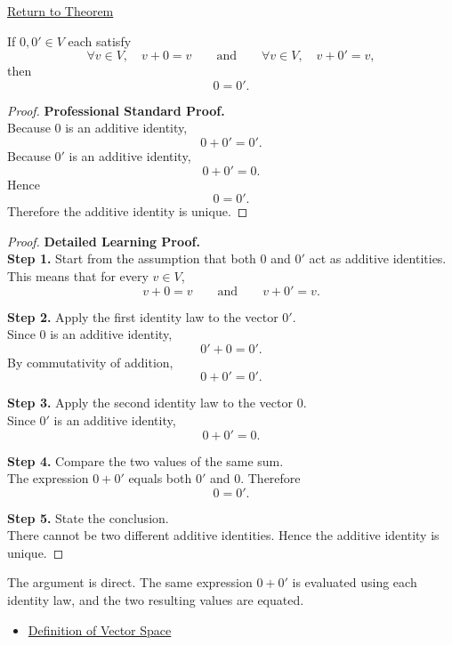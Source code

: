 
\newpage
{}
\label{prf:unique-additive-identity}

\begin{remark*}[Return]
\hyperref[thm:unique-additive-identity]{Return to Theorem}
\end{remark*}

\begin{theorem*}
If $0,0' \in V$ each satisfy
\[
\forall v \in V,\quad v+0=v
\qquad\text{and}\qquad
\forall v \in V,\quad v+0'=v,
\]
then
\[
0=0'.
\]
\end{theorem*}

\begin{proof}
\textbf{Professional Standard Proof.}~\\
Because $0$ is an additive identity,
\[
0+0'=0'.
\]
Because $0'$ is an additive identity,
\[
0+0'=0.
\]
Hence
\[
0=0'.
\]
Therefore the additive identity is unique.
\end{proof}

\begin{proof}
\textbf{Detailed Learning Proof.}~\\

\textbf{Step 1.} Start from the assumption that both $0$ and $0'$ act as additive identities.\\
This means that for every $v \in V$,
\[
v+0=v
\qquad\text{and}\qquad
v+0'=v.
\]

\textbf{Step 2.} Apply the first identity law to the vector $0'$.\\
Since $0$ is an additive identity,
\[
0'+0=0'.
\]
By commutativity of addition,
\[
0+0'=0'.
\]

\textbf{Step 3.} Apply the second identity law to the vector $0$.\\
Since $0'$ is an additive identity,
\[
0+0'=0.
\]

\textbf{Step 4.} Compare the two values of the same sum.\\
The expression $0+0'$ equals both $0'$ and $0$. Therefore
\[
0=0'.
\]

\textbf{Step 5.} State the conclusion.\\
There cannot be two different additive identities. Hence the additive identity is unique.
\end{proof}

\begin{remark*}
The argument is direct. The same expression $0+0'$ is evaluated using each identity law, and the two resulting values are equated.
\end{remark*}

\begin{remark*}[Dependencies]
\hfill
\begin{itemize}
  \item \hyperref[def:vector-space]{Definition of Vector Space}
\end{itemize}
\end{remark*}